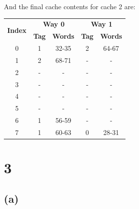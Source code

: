 \documentclass[12pt]{article}
\begin{document}
And the final cache contents for cache 2 are:

\begin{table}[h!]
    \centering
    \begin{tabular}{|c|c|c|c|c|}
    \hline
    \multirow{2}{*}{\textbf{Index}} & \multicolumn{2}{c|}{\textbf{Way 0}}     & \multicolumn{2}{c|}{\textbf{Way 1}}     \\
    \cline{2-5}
                                    & \textbf{Tag} & \textbf{Words}          & \textbf{Tag} & \textbf{Words}          \\
    \hline
    0                               & 1            & 32-35                   & 2            & 64-67                   \\
    \hline
    1                               & 2            & 68-71                   & -            & -                       \\
    \hline
    2                               & -            & -                       & -            & -                       \\
    \hline
    3                               & -            & -                       & -            & -                       \\
    \hline
    4                               & -            & -                       & -            & -                       \\
    \hline
    5                               & -            & -                       & -            & -                       \\
    \hline
    6                               & 1            & 56-59                   & -            & -                       \\
    \hline
    7                               & 1            & 60-63                   & 0            & 28-31                   \\
    \hline
    \end{tabular}
\end{table}

\clearpage

\section*{3}

\subsection*{(a)}
\end{document}

